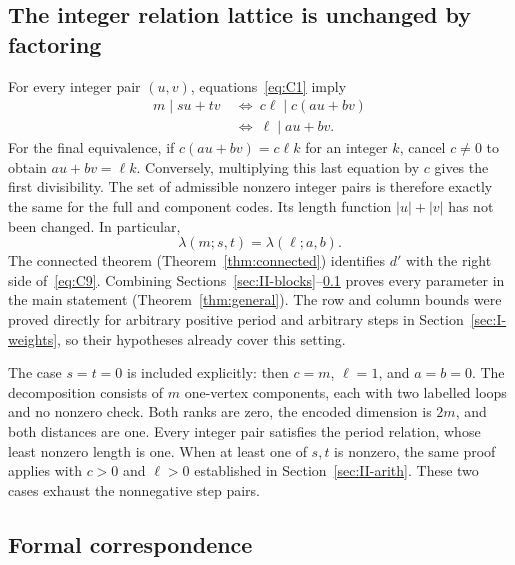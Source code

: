 \documentclass{article}
\numberwithin{equation}{section}
\begin{document}
\subsection{The integer relation lattice is unchanged by factoring}\label{sec:II-lattice}

For every integer pair \((u,v)\), equations~\eqref{eq:C1} imply
\begin{equation}\label{eq:C8}
  \begin{aligned}
    m\mid su+tv
    &\ \Longleftrightarrow\
     c\ell\mid c(au+bv)\\
    &\ \Longleftrightarrow\
     \ell\mid au+bv.
  \end{aligned}
\end{equation}
For the final equivalence, if \(c(au+bv)=c\ell k\) for an integer
\(k\), cancel \(c\ne0\) to obtain \(au+bv=\ell k\). Conversely,
multiplying this last equation by \(c\) gives the first divisibility.
The set of admissible nonzero integer pairs is therefore exactly
the same for the full and component codes. Its length function
\(|u|+|v|\) has not been changed. In particular,
\begin{equation}\label{eq:C9}
  \lambda(m;s,t)=\lambda(\ell;a,b).
\end{equation}
The connected theorem (Theorem~\ref{thm:connected}) identifies \(d'\) with the right
side of~\eqref{eq:C9}.
Combining Sections~\ref{sec:II-blocks}--\ref{sec:II-lattice} proves every parameter in
the main statement (Theorem~\ref{thm:general}).
The row and column bounds were proved directly for arbitrary
positive period and arbitrary steps in Section~\ref{sec:I-weights}, so their hypotheses
already cover this setting.

The case \(s=t=0\) is included explicitly: then \(c=m\), \(\ell=1\),
and \(a=b=0\). The decomposition consists of \(m\) one-vertex components,
each with two labelled loops and no nonzero check. Both ranks
are zero, the encoded dimension is \(2m\), and both distances are
one. Every integer pair satisfies the period relation, whose least
nonzero length is one. When at least one of \(s,t\) is nonzero, the
same proof applies with \(c>0\) and \(\ell>0\) established in
Section~\ref{sec:II-arith}.
These two cases exhaust the nonnegative step pairs.

\subsection{Formal correspondence}\label{sec:II-formal}
\end{document}
